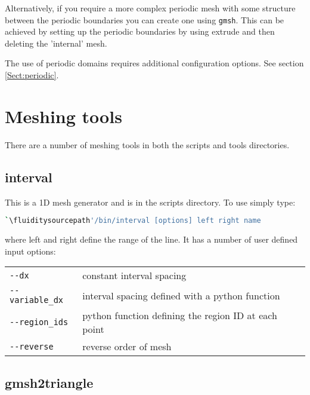 Alternatively, if you require a more complex periodic mesh with some structure between the periodic 
boundaries you can create one using \lstinline[language=Bash]{gmsh}. This can be achieved by 
setting up the periodic boundaries by using extrude and then deleting the 'internal' mesh.

The use of periodic domains requires additional configuration options. See
section \ref{Sect:periodic}.

\section{Meshing tools}

There are a number of meshing tools in both the scripts and tools directories.

\subsection{interval}
This is a 1D mesh generator and is in the scripts directory. To use simply type:


\begin{lstlisting}[language = Bash]
`\fluiditysourcepath'/bin/interval [options] left right name 
\end{lstlisting}

where left and right define the range of the line. It has a number of user defined input options:


\begin{center}
  \begin{tabular}{lp{}}
    \hline
    \lstinline+--dx+ & constant interval spacing\\
    \lstinline+--variable_dx+ & interval spacing defined with a python function\\
    \lstinline+--region_ids+ & python function defining the region ID at each point\\
    \lstinline+--reverse+ & reverse order of mesh\\
    \hline
  \end{tabular}
\end{center}



\subsection{gmsh2triangle}

